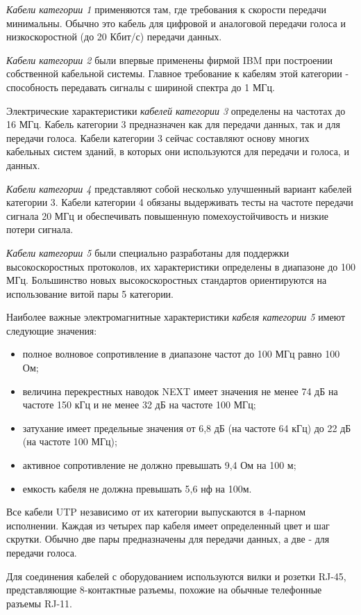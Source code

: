 \emph{Кабели категории 1} применяются там, где требования к скорости передачи минимальны.
Обычно это кабель для цифровой и аналоговой передачи голоса и низкоскоростной (до 20 Кбит/с) передачи данных.

\emph{Кабели категории 2} были впервые применены фирмой IBM при построении собственной кабельной системы.
Главное требование к кабелям этой категории - способность передавать сигналы с шириной спектра до 1 МГц.

Электрические характеристики \emph{кабелей категории 3} определены на частотах до 16 МГц.
Кабель категории 3 предназначен как для передачи данных, так и для передачи голоса.
Кабели категории 3 сейчас составляют основу многих кабельных систем зданий, в которых они используются для передачи и голоса, и данных.

\emph{Кабели категории 4} представляют собой несколько улучшенный вариант кабелей категории 3.
Кабели категории 4 обязаны выдерживать тесты на частоте передачи сигнала 20 МГц и обеспечивать повышенную помехоустойчивость и низкие потери сигнала.

\emph{Кабели категории 5} были специально разработаны для поддержки высокоскоростных протоколов, их характеристики определены в диапазоне до 100 МГц.
Большинство новых высокоскоростных стандартов ориентируются на использование витой пары 5 категории.

Наиболее важные электромагнитные характеристики \emph{кабеля категории 5} имеют следующие значения:
\begin{itemize}
    \item полное волновое сопротивление в диапазоне частот до 100 МГц равно 100 Ом;
    \item величина перекрестных наводок NEXT имеет значения не менее 74 дБ на частоте 150 кГц и не менее 32 дБ на частоте 100 МГц;
    \item затухание имеет предельные значения от 6,8 дБ (на частоте 64 кГц) до 22 дБ (на частоте 100 МГц);
    \item активное сопротивление не должно превышать 9,4 Ом на 100 м;
    \item емкость кабеля не должна превышать 5,6 нф на 100м.
\end{itemize}

Все кабели UTP независимо от их категории выпускаются в 4-парном исполнении.
Каждая из четырех пар кабеля имеет определенный цвет и шаг скрутки.
Обычно две пары предназначены для передачи данных, а две - для передачи голоса.

Для соединения кабелей с оборудованием используются вилки и розетки RJ-45, представляющие 8-контактные разъемы, похожие на обычные телефонные разъемы RJ-11.

